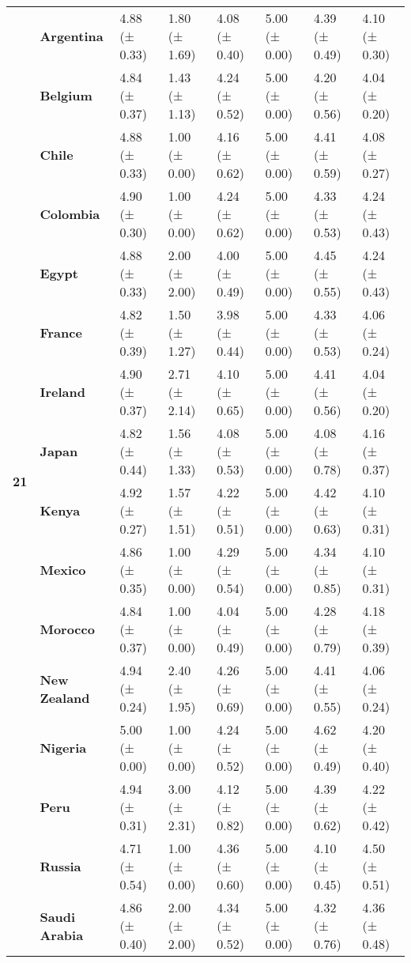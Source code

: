 \begin{longtable}{llllllll}
\cline{1-8}
\multirow[t]{19}{*}{\textbf{21}} & \textbf{Argentina} & 4.88 (± 0.33) & 1.80 (± 1.69) & 4.08 (± 0.40) & 5.00 (± 0.00) & 4.39 (± 0.49) & 4.10 (± 0.30) \\
\textbf{} & \textbf{Belgium} & 4.84 (± 0.37) & 1.43 (± 1.13) & 4.24 (± 0.52) & 5.00 (± 0.00) & 4.20 (± 0.56) & 4.04 (± 0.20) \\
\textbf{} & \textbf{Chile} & 4.88 (± 0.33) & 1.00 (± 0.00) & 4.16 (± 0.62) & 5.00 (± 0.00) & 4.41 (± 0.59) & 4.08 (± 0.27) \\
\textbf{} & \textbf{Colombia} & 4.90 (± 0.30) & 1.00 (± 0.00) & 4.24 (± 0.62) & 5.00 (± 0.00) & 4.33 (± 0.53) & 4.24 (± 0.43) \\
\textbf{} & \textbf{Egypt} & 4.88 (± 0.33) & 2.00 (± 2.00) & 4.00 (± 0.49) & 5.00 (± 0.00) & 4.45 (± 0.55) & 4.24 (± 0.43) \\
\textbf{} & \textbf{France} & 4.82 (± 0.39) & 1.50 (± 1.27) & 3.98 (± 0.44) & 5.00 (± 0.00) & 4.33 (± 0.53) & 4.06 (± 0.24) \\
\textbf{} & \textbf{Ireland} & 4.90 (± 0.37) & 2.71 (± 2.14) & 4.10 (± 0.65) & 5.00 (± 0.00) & 4.41 (± 0.56) & 4.04 (± 0.20) \\
\textbf{} & \textbf{Japan} & 4.82 (± 0.44) & 1.56 (± 1.33) & 4.08 (± 0.53) & 5.00 (± 0.00) & 4.08 (± 0.78) & 4.16 (± 0.37) \\
\textbf{} & \textbf{Kenya} & 4.92 (± 0.27) & 1.57 (± 1.51) & 4.22 (± 0.51) & 5.00 (± 0.00) & 4.42 (± 0.63) & 4.10 (± 0.31) \\
\textbf{} & \textbf{Mexico} & 4.86 (± 0.35) & 1.00 (± 0.00) & 4.29 (± 0.54) & 5.00 (± 0.00) & 4.34 (± 0.85) & 4.10 (± 0.31) \\
\textbf{} & \textbf{Morocco} & 4.84 (± 0.37) & 1.00 (± 0.00) & 4.04 (± 0.49) & 5.00 (± 0.00) & 4.28 (± 0.79) & 4.18 (± 0.39) \\
\textbf{} & \textbf{New Zealand} & 4.94 (± 0.24) & 2.40 (± 1.95) & 4.26 (± 0.69) & 5.00 (± 0.00) & 4.41 (± 0.55) & 4.06 (± 0.24) \\
\textbf{} & \textbf{Nigeria} & 5.00 (± 0.00) & 1.00 (± 0.00) & 4.24 (± 0.52) & 5.00 (± 0.00) & 4.62 (± 0.49) & 4.20 (± 0.40) \\
\textbf{} & \textbf{Peru} & 4.94 (± 0.31) & 3.00 (± 2.31) & 4.12 (± 0.82) & 5.00 (± 0.00) & 4.39 (± 0.62) & 4.22 (± 0.42) \\
\textbf{} & \textbf{Russia} & 4.71 (± 0.54) & 1.00 (± 0.00) & 4.36 (± 0.60) & 5.00 (± 0.00) & 4.10 (± 0.45) & 4.50 (± 0.51) \\
\textbf{} & \textbf{Saudi Arabia} & 4.86 (± 0.40) & 2.00 (± 2.00) & 4.34 (± 0.52) & 5.00 (± 0.00) & 4.32 (± 0.76) & 4.36 (± 0.48) \\

\end{longtable}
